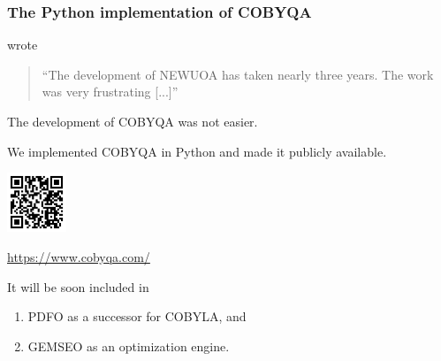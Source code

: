 \documentclass{polyu-presentation}
\begin{document}
\begin{frame}
    \frametitle{The Python implementation of COBYQA}

    \begin{block}{}
        \textcite{Powell_2006} wrote
        \begin{quote}
            \enquote{The development of NEWUOA has taken nearly \alert{three years}. The work was very \alert{frustrating} [...]}
        \end{quote}
        The development of COBYQA was \alert{not easier}.
    \end{block}

    We implemented COBYQA in \alert{Python} and made it \alert{publicly available}.
    
	\begin{center}
        \href{https://www.cobyqa.com/}{\includegraphics[width=0.7in]{images/qr/cobyqa.png}}

        \scriptsize\url{https://www.cobyqa.com/}
    \end{center}

    It will be soon included in
    \begin{enumerate}
        \item PDFO as a successor for COBYLA, and
        \item GEMSEO as an optimization engine.
    \end{enumerate}
\end{frame}
\end{document}
